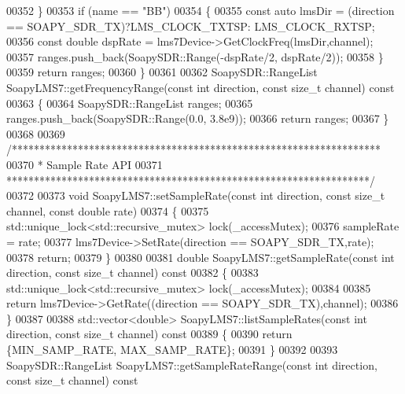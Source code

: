 \begin{DoxyCode}
{{{{{{{{{{{00352     \}
00353     \textcolor{keywordflow}{if} (name == \textcolor{stringliteral}{"BB"})
00354     \{
00355         \textcolor{keyword}{const} \textcolor{keyword}{auto} lmsDir = (direction == SOAPY_SDR_TX)?LMS_CLOCK_TXTSP:
      LMS_CLOCK_RXTSP;
00356         \textcolor{keyword}{const} \textcolor{keywordtype}{double} dspRate = lms7Device->GetClockFreq(lmsDir,channel);
00357         ranges.push\_back(SoapySDR::Range(-dspRate/2, dspRate/2));
00358     \}
00359     \textcolor{keywordflow}{return} ranges;
00360 \}
00361 
00362 SoapySDR::RangeList SoapyLMS7::getFrequencyRange(\textcolor{keyword}{const} \textcolor{keywordtype}{int} direction, \textcolor{keyword}{const} \textcolor{keywordtype}{size\_t} channel)\textcolor{keyword}{ const}
00363 \textcolor{keyword}{}\{
00364     SoapySDR::RangeList ranges;
00365     ranges.push\_back(SoapySDR::Range(0.0, 3.8e9));
00366     \textcolor{keywordflow}{return} ranges;
00367 \}
00368 
00369 \textcolor{comment}{/*******************************************************************}
00370 \textcolor{comment}{ * Sample Rate API}
00371 \textcolor{comment}{ ******************************************************************/}
00372 
00373 \textcolor{keywordtype}{void} SoapyLMS7::setSampleRate(\textcolor{keyword}{const} \textcolor{keywordtype}{int} direction, \textcolor{keyword}{const} \textcolor{keywordtype}{size\_t} channel, \textcolor{keyword}{const} \textcolor{keywordtype}{double} 
      rate)
00374 \{
00375     std::unique\_lock<std::recursive\_mutex> lock(_accessMutex);
00376     sampleRate = rate;
00377     lms7Device->SetRate(direction == SOAPY_SDR_TX,rate);
00378     \textcolor{keywordflow}{return};
00379 \}
00380 
00381 \textcolor{keywordtype}{double} SoapyLMS7::getSampleRate(\textcolor{keyword}{const} \textcolor{keywordtype}{int} direction, \textcolor{keyword}{const} \textcolor{keywordtype}{size\_t} channel)\textcolor{keyword}{ const}
00382 \textcolor{keyword}{}\{
00383     std::unique\_lock<std::recursive\_mutex> lock(_accessMutex);
00384 
00385     \textcolor{keywordflow}{return} lms7Device->GetRate((direction == SOAPY_SDR_TX),channel);
00386 \}
00387 
00388 std::vector<double> SoapyLMS7::listSampleRates(\textcolor{keyword}{const} \textcolor{keywordtype}{int} direction, \textcolor{keyword}{const} \textcolor{keywordtype}{size\_t} channel)\textcolor{keyword}{ const}
00389 \textcolor{keyword}{}\{
00390     \textcolor{keywordflow}{return} \{MIN_SAMP_RATE, MAX_SAMP_RATE\};
00391 \}
00392 
00393 SoapySDR::RangeList SoapyLMS7::getSampleRateRange(\textcolor{keyword}{const} \textcolor{keywordtype}{int} direction, \textcolor{keyword}{const} \textcolor{keywordtype}{size\_t} channel)\textcolor{keyword}{ const}
}}}}}}}}}}}
\end{DoxyCode}
